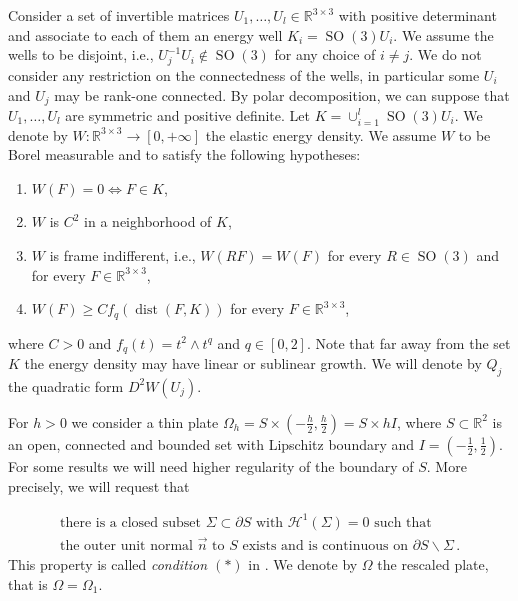\documentclass{article}
\theoremstyle{plain}
\theoremstyle{plain}
\theoremstyle{plain}
\theoremstyle{plain}
\theoremstyle{plain}
\theoremstyle{definition}
\theoremstyle{definition}
\renewcommand{\r}{\mathbb{R}}
\DeclareMathOperator{\SO}{SO}
\DeclareMathOperator{\dist}{dist}
\begin{document}
Consider a set of invertible matrices $U_1, \ldots, U_l \in \r^{3 \times 3}$ with positive determinant and associate to each of them an energy well $K_i = \SO(3) U_i$. We assume the wells to be disjoint, i.e., $U_j^{-1} U_i \notin \SO(3)$ for any choice of $i \neq j$. We do not consider any restriction on the connectedness of the wells, in particular some $U_i$ and $U_j$ may be rank-one connected. By polar decomposition, we can suppose that $U_1, \dots, U_l$ are symmetric and positive definite. Let $K = \cup_{i=1}^{l}\SO(3)U_i$. We denote by $W \colon \r^{3 \times 3} \to [0, +\infty]$ the elastic energy density. We assume $W$ to be Borel measurable and to satisfy the following hypotheses:
\begin{enumerate}[start=1,label={(W\arabic*)}]
    \item $W(F) = 0 \iff F \in K$, \label{item:minimization_W}
    \item $W$ is $C^2$ in a neighborhood of $K$, \label{item:regularity_W}
    \item $W$ is frame indifferent, i.e., $W(RF) = W(F)$ for every $R \in \SO(3)$ and for every $F \in \r^{3 \times 3}$, \label{item:frame_indifference}
    \item $W(F) \geq C f_q(\dist(F, K))$ for every $F \in \r^{3 \times 3}$, \label{item:lower_bound_W}
\end{enumerate}
where $C > 0$ and $f_q(t) = t^2 \land t^q$ and $q \in [0,2]$. Note that far away from the set $K$ the energy density may have linear or sublinear growth. We will denote by $Q_j$ the quadratic form $D^2W(U_j)$. 

For $h > 0$ we consider a thin plate $\Omega_h = S \times (-\frac{h}{2}, \frac{h}{2}) = S \times hI$, where $S \subset \r^2$ is an open, connected and bounded set with Lipschitz boundary and $I = (-\frac{1}{2}, \frac{1}{2})$. For some results we will need higher regularity of the boundary of $S$. More precisely, we will request that 

\begin{equation}\label{eq:boundary_condition}
	\begin{gathered}
		\text{there is a closed subset } \Sigma \subset \partial S \text{ with } \mathcal{H}^1(\Sigma) = 0 \text{ such that}\\
		 \text{the outer unit normal } \vec n \text{ to } S \text{ exists and is continuous on } \partial S \backslash \Sigma\,.
	\end{gathered}
\end{equation}
This property is called \textit{condition $(\ast)$} in \cite{HORNUNG2011}. We denote by $\Omega$ the rescaled plate, that is $\Omega = \Omega_1$.
\end{document}
